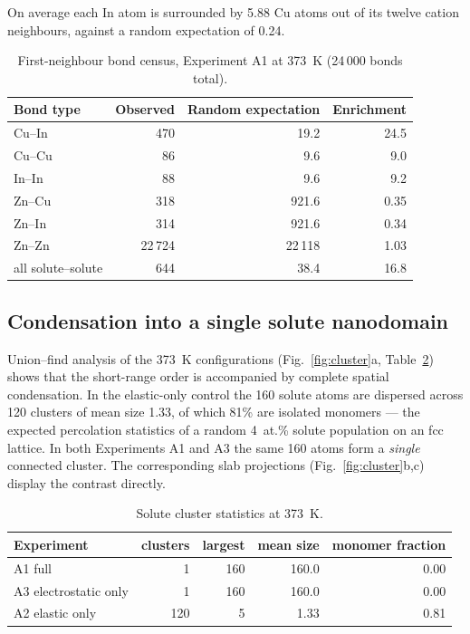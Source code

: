 \documentclass[11pt,a4paper]{article}
\begin{document}
On average each In atom is surrounded by 5.88 Cu atoms out of its twelve cation
neighbours, against a random expectation of 0.24.

\begin{table}[htbp]
\centering
\caption{First-neighbour bond census, Experiment A1 at 373~K (24\,000 bonds
total).}
\label{tab:bonds}
\small
\begin{tabular}{lrrr}
\toprule
Bond type & Observed & Random expectation & Enrichment \\
\midrule
Cu--In & 470 & 19.2 & 24.5 \\
Cu--Cu & 86 & 9.6 & 9.0 \\
In--In & 88 & 9.6 & 9.2 \\
Zn--Cu & 318 & 921.6 & 0.35 \\
Zn--In & 314 & 921.6 & 0.34 \\
Zn--Zn & 22\,724 & 22\,118 & 1.03 \\
\midrule
all solute--solute & 644 & 38.4 & 16.8 \\
\bottomrule
\end{tabular}
\end{table}

\subsection{Condensation into a single solute nanodomain}
\label{sec:clusters}

Union--find analysis of the 373~K configurations (Fig.~\ref{fig:cluster}a,
Table~\ref{tab:clusters}) shows that the short-range order is accompanied by
complete spatial condensation. In the elastic-only control the 160 solute atoms
are dispersed across 120 clusters of mean size 1.33, of which 81\% are isolated
monomers --- the expected percolation statistics of a random 4~at.\% solute
population on an fcc lattice. In both Experiments A1 and A3 the same 160 atoms
form a \emph{single} connected cluster. The corresponding slab projections
(Fig.~\ref{fig:cluster}b,c) display the contrast directly.

\begin{table}[htbp]
\centering
\caption{Solute cluster statistics at 373~K.}
\label{tab:clusters}
\small
\begin{tabular}{lrrrr}
\toprule
Experiment & clusters & largest & mean size & monomer fraction \\
\midrule
A1 full & 1 & 160 & 160.0 & 0.00 \\
A3 electrostatic only & 1 & 160 & 160.0 & 0.00 \\
A2 elastic only & 120 & 5 & 1.33 & 0.81 \\
\bottomrule
\end{tabular}
\end{table}
\end{document}
